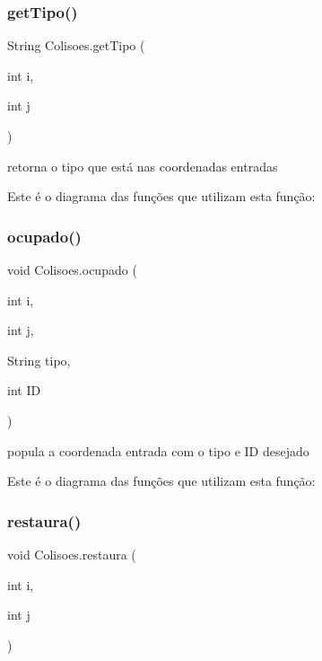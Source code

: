 \subsubsection{\texorpdfstring{get\+Tipo()}{getTipo()}}
{\footnotesize\ttfamily String Colisoes.\+get\+Tipo (\begin{DoxyParamCaption}\item[{int}]{i,  }\item[{int}]{j }\end{DoxyParamCaption})}



retorna o tipo que está nas coordenadas entradas 

Este é o diagrama das funções que utilizam esta função\+:
\mbox{\label{class_colisoes_aee76e39346a03b3f6eeddbca2efe8067}} 
\subsubsection{\texorpdfstring{ocupado()}{ocupado()}}
{\footnotesize\ttfamily void Colisoes.\+ocupado (\begin{DoxyParamCaption}\item[{int}]{i,  }\item[{int}]{j,  }\item[{String}]{tipo,  }\item[{int}]{ID }\end{DoxyParamCaption})}



popula a coordenada entrada com o tipo e ID desejado 

Este é o diagrama das funções que utilizam esta função\+:
\mbox{\label{class_colisoes_ad901b8e1997c5166cf91e1571fc8a9b9}} 
\subsubsection{\texorpdfstring{restaura()}{restaura()}}
{\footnotesize\ttfamily void Colisoes.\+restaura (\begin{DoxyParamCaption}\item[{int}]{i,  }\item[{int}]{j }\end{DoxyParamCaption})}


